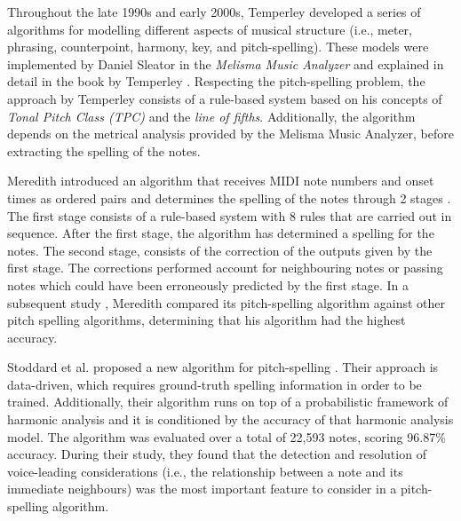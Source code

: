 Throughout the late 1990s and early 2000s, Temperley
developed a series of algorithms for modelling different
aspects of musical structure (i.e., meter, phrasing,
counterpoint, harmony, key, and pitch-spelling). These
models were implemented by Daniel Sleator in the
\emph{Melisma Music Analyzer} and explained in detail in the
book by Temperley \parencite{temperley2004cognition}.
Respecting the pitch-spelling problem, the approach by
Temperley consists of a rule-based system based on his
concepts of \emph{Tonal Pitch Class (TPC)} and the
\emph{line of fifths}. Additionally, the algorithm depends
on the metrical analysis provided by the Melisma Music
Analyzer, before extracting the spelling of the notes.

Meredith introduced an algorithm that receives MIDI note
numbers and onset times as ordered pairs and determines the
spelling of the notes through 2 stages
\parencite{meredith2003pitch}. The first stage consists of a
rule-based system with 8 rules that are carried out in
sequence. After the first stage, the algorithm has
determined a spelling for the notes. The second stage,
consists of the correction of the outputs given by the first
stage. The corrections performed account for neighbouring
notes or passing notes which could have been erroneously
predicted by the first stage. In a subsequent study
\parencite{meredith2005comparing}, Meredith compared its
pitch-spelling algorithm against other pitch spelling
algorithms, determining that his algorithm had the highest
accuracy.



Stoddard et al. proposed a new algorithm for pitch-spelling
\parencite{stoddard2004welltempered}. Their approach is
data-driven, which requires ground-truth spelling
information in order to be trained. Additionally, their
algorithm runs on top of a probabilistic framework of
harmonic analysis \parencite{raphael2003harmonic} and it is
conditioned by the accuracy of that harmonic analysis model.
The algorithm was evaluated over a total of 22,593 notes,
scoring 96.87\% accuracy. During their study, they found
that the detection and resolution of voice-leading
considerations (i.e., the relationship between a note and
its immediate neighbours) was the most important feature to
consider in a pitch-spelling algorithm.

